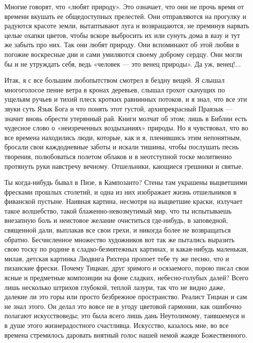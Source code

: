 Многие говорят,  что «любят природу».  Это означает, что они  не прочь
время от времени вкушать  ее общедоступных прелестей. Они отправляются
на прогулку и радуются красоте земли, вытаптывают луга и возвращаются,
не преминув нарвать целые охапки цветов, чтобы вскоре выбросить их или
сунуть дома в вазу и тут же забыть про них. Так они любят природу. Они
вспоминают об  этой любви  в погожие воскресные  дни и  сами умиляются
своему доброму сердцу. Они могли бы и не утруждать себя, ведь «человек
--- это венец природы». Да уж, венец!...

Итак, я  с все большим любопытством  смотрел в бездну вещей.  Я слышал
многоголосое пение ветра в кронах  деревьев, слышал грохот скачущих по
ущельям ручьев и тихий плеск кротких  равнинных потоков, и я знал, что
все эти звуки суть Язык Бога  и что понять этот густой, архипрекрасный
Праязык --- значит вновь обрести  утерянный рай. Книги молчат об этом;
лишь  в  Библии  есть  чудесное  слово  о  «неизреченных  воздыханиях»
природы. Но я чувствовал, что во все времена находились люди, которые,
как и я, пленившись этим  непонятным, бросали свои каждодневные заботы
и искали тишины, чтобы  послушать песнь творения, полюбоваться полетом
облаков  и в  неотступной  тоске молитвенно  протянуть руки  навстречу
вечному. Отшельники, кающиеся грешники и святые.

Ты  когда-нибудь  бывал  в  Пизе, в  Кампозанто?  Стены  там  украшены
выцветшими  фресками  прошлых  столетий,  и  одна  из  них  изображает
жизнь    отшельников   в    фиванской   пустыне.    Наивная   картина,
несмотря  на  выцветшие  краски,   излучает  такое  волшебство,  такой
блаженно-невозмутимый  мир,  что  ты   испытываешь  внезапную  боль  и
неистовое желание очиститься где-нибудь, в заповедной, священной дали,
выплакав  все свои  грехи, и  никогда более  не возвращаться  обратно.
Бесчисленное  множество  художников  вот   так  же  пытались  выразить
свою  тоску по  родине в  сладко-безмятежных картинах,  и какая-нибудь
маленькая,  милая, детская  картинка Людвига  Рихтера пропоет  тебе ту
же  песню, что  и  пизанские  фрески. Почему  Тициан,  друг зримого  и
осязаемого, порою  писал свои  ясные и  предметные композиции  на фоне
сладких, небесно-голубых далей? Всего лишь несколько штрихов глубокой,
теплой лазури, так  что не видно даже, далекие ли  это горы или просто
безбрежное пространство. Реалист Тициан и  сам не знал этого. Он делал
это  вовсе  не  в  угоду  цветовой  гармонии,  как  ошибочно  полагают
искусствоведы; это  была всего лишь  дань Неутолимому, таившемуся  и в
душе  этого жизнерадостного  счастливца. Искусство,  казалось мне,  во
все  времена  стремилось  даровать  внятный голос  нашей  немой  жажде
Божественного.

